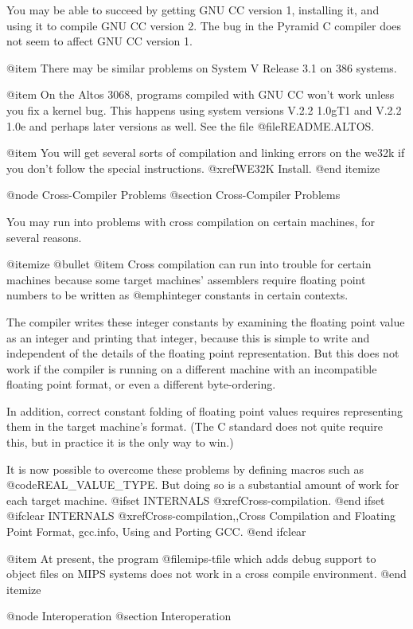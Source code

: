 You may be able to succeed by getting GNU CC version 1, installing it,
and using it to compile GNU CC version 2.  The bug in the Pyramid C
compiler does not seem to affect GNU CC version 1.

@item
There may be similar problems on System V Release 3.1 on 386 systems.

@item
On the Altos 3068, programs compiled with GNU CC won't work unless you
fix a kernel bug.  This happens using system versions V.2.2 1.0gT1 and
V.2.2 1.0e and perhaps later versions as well.  See the file
@file{README.ALTOS}.

@item
You will get several sorts of compilation and linking errors on the
we32k if you don't follow the special instructions.  @xref{WE32K
Install}.
@end itemize

@node Cross-Compiler Problems
@section Cross-Compiler Problems

You may run into problems with cross compilation on certain machines,
for several reasons.

@itemize @bullet
@item
Cross compilation can run into trouble for certain machines because
some target machines' assemblers require floating point numbers to be
written as @emph{integer} constants in certain contexts.

The compiler writes these integer constants by examining the floating
point value as an integer and printing that integer, because this is
simple to write and independent of the details of the floating point
representation.  But this does not work if the compiler is running on
a different machine with an incompatible floating point format, or
even a different byte-ordering.

In addition, correct constant folding of floating point values
requires representing them in the target machine's format.
(The C standard does not quite require this, but in practice
it is the only way to win.)

It is now possible to overcome these problems by defining macros such
as @code{REAL_VALUE_TYPE}.  But doing so is a substantial amount of
work for each target machine.
@ifset INTERNALS
@xref{Cross-compilation}.
@end ifset
@ifclear INTERNALS
@xref{Cross-compilation,,Cross Compilation and Floating Point Format,
gcc.info, Using and Porting GCC}.
@end ifclear

@item
At present, the program @file{mips-tfile} which adds debug
support to object files on MIPS systems does not work in a cross
compile environment.
@end itemize

@node Interoperation
@section Interoperation

